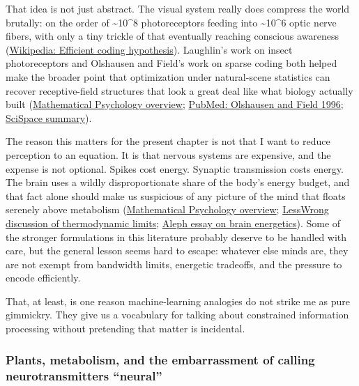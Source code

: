 That idea is not just abstract. The visual system really does compress the world brutally: on the order of \textasciitilde10\^{}8 photoreceptors feeding into \textasciitilde10\^{}6 optic nerve fibers, with only a tiny trickle of that eventually reaching conscious awareness (\href{https://en.wikipedia.org/wiki/Efficient_coding_hypothesis}{Wikipedia: Efficient coding hypothesis}). Laughlin's work on insect photoreceptors and Olshausen and Field's work on sparse coding both helped make the broader point that optimization under natural-scene statistics can recover receptive-field structures that look a great deal like what biology actually built (\href{https://www.mathematicalpsychology.com/Efficient_Coding_Hypothesis}{Mathematical Psychology overview}; \href{https://pubmed.ncbi.nlm.nih.gov/8637596/}{PubMed: Olshausen and Field 1996}; \href{https://scispace.com/papers/emergence-of-simple-cell-receptive-field-properties-by-bulmogedmu}{SciSpace summary}).

The reason this matters for the present chapter is not that I want to reduce perception to an equation. It is that nervous systems are expensive, and the expense is not optional. Spikes cost energy. Synaptic transmission costs energy. The brain uses a wildly disproportionate share of the body's energy budget, and that fact alone should make us suspicious of any picture of the mind that floats serenely above metabolism (\href{https://www.mathematicalpsychology.com/Efficient_Coding_Hypothesis}{Mathematical Psychology overview}; \href{https://www.lesswrong.com/posts/mW7pzgthMgFu9BiFX/the-brain-is-not-close-to-thermodynamic-limits-on}{LessWrong discussion of thermodynamic limits}; \href{https://aleph.se/andart2/neuroscience/energetics-of-the-brain-and-ai/}{Aleph essay on brain energetics}). Some of the stronger formulations in this literature probably deserve to be handled with care, but the general lesson seems hard to escape: whatever else minds are, they are not exempt from bandwidth limits, energetic tradeoffs, and the pressure to encode efficiently.

That, at least, is one reason machine-learning analogies do not strike me as pure gimmickry. They give us a vocabulary for talking about constrained information processing without pretending that matter is incidental.

\subsubsection{Plants, metabolism, and the embarrassment of calling neurotransmitters ``neural''}\label{03_it_started-plants-metabolism-and-the-embarrassment-of-calling-neurotransmitters-neural}

